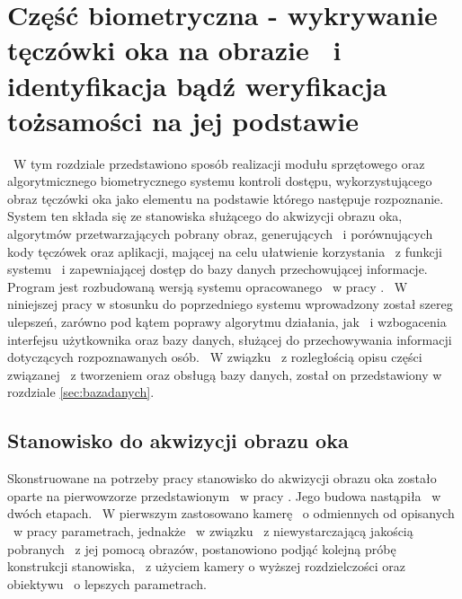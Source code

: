 \chapter{Część biometryczna - wykrywanie tęczówki oka na obrazie ~i identyfikacja bądź weryfikacja tożsamości na jej podstawie}
\label{cha:realizacja}
~W tym rozdziale przedstawiono sposób realizacji modułu sprzętowego oraz algorytmicznego biometrycznego systemu kontroli dostępu, wykorzystującego obraz tęczówki oka jako elementu na podstawie którego następuje rozpoznanie. System ten składa się ze stanowiska służącego do akwizycji obrazu oka, algorytmów przetwarzających pobrany obraz, generujących ~i porównujących kody tęczówek oraz aplikacji, mającej na celu ułatwienie korzystania ~z funkcji systemu ~i zapewniającej dostęp do bazy danych przechowującej informacje. Program jest rozbudowaną wersją systemu opracowanego ~w pracy \cite{Gl11}. ~W niniejszej pracy w stosunku do poprzedniego systemu wprowadzony został szereg ulepszeń, zarówno pod kątem poprawy algorytmu działania, jak ~i wzbogacenia interfejsu użytkownika oraz bazy danych, służącej do przechowywania informacji dotyczących rozpoznawanych osób. ~W związku ~z rozległością opisu części związanej ~z tworzeniem oraz obsługą bazy danych, został on przedstawiony w rozdziale \ref{sec:bazadanych}.

\section{Stanowisko do akwizycji obrazu oka}
\label{sec:stanowisko}
Skonstruowane na potrzeby pracy stanowisko do akwizycji obrazu oka zostało oparte na pierwowzorze przedstawionym ~w pracy \cite{Gl11}. Jego budowa  nastąpiła ~w dwóch etapach. ~W pierwszym zastosowano kamerę ~o odmiennych od opisanych ~w pracy \cite{Gl11} parametrach, jednakże ~w związku ~z niewystarczającą jakością pobranych ~z jej pomocą obrazów, postanowiono podjąć kolejną próbę konstrukcji stanowiska, ~z użyciem kamery o wyższej rozdzielczości oraz obiektywu ~o lepszych parametrach.

